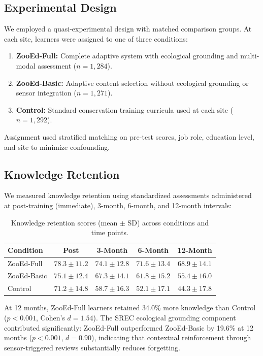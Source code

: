 \documentclass[11pt,a4paper]{article}
\begin{document}
\subsection{Experimental Design}

We employed a quasi-experimental design with matched comparison groups.
At each site, learners were assigned to one of three conditions:

\begin{enumerate}[leftmargin=*]
    \item \textbf{ZooEd-Full:} Complete adaptive system with ecological grounding and multi-modal assessment ($n = 1,284$).
    \item \textbf{ZooEd-Basic:} Adaptive content selection without ecological grounding or sensor integration ($n = 1,271$).
    \item \textbf{Control:} Standard conservation training curricula used at each site ($n = 1,292$).
\end{enumerate}

Assignment used stratified matching on pre-test scores, job role, education level, and site to minimize confounding.

\subsection{Knowledge Retention}

We measured knowledge retention using standardized assessments administered at post-training (immediate), 3-month, 6-month, and 12-month intervals:

\begin{table}[H]
\centering
\caption{Knowledge retention scores (mean $\pm$ SD) across conditions and time points.}
\label{tab:retention}
\begin{tabular}{@{}lcccc@{}}
\toprule
\textbf{Condition} & \textbf{Post} & \textbf{3-Month} & \textbf{6-Month} & \textbf{12-Month} \\
\midrule
ZooEd-Full & $78.3 \pm 11.2$ & $74.1 \pm 12.8$ & $71.6 \pm 13.4$ & $68.9 \pm 14.1$ \\
ZooEd-Basic & $75.1 \pm 12.4$ & $67.3 \pm 14.1$ & $61.8 \pm 15.2$ & $55.4 \pm 16.0$ \\
Control & $71.2 \pm 14.8$ & $58.7 \pm 16.3$ & $52.1 \pm 17.1$ & $44.3 \pm 17.8$ \\
\bottomrule
\end{tabular}
\end{table}

At 12 months, ZooEd-Full learners retained 34.0\% more knowledge than Control ($p < 0.001$, Cohen's $d = 1.54$).
The SREC ecological grounding component contributed significantly: ZooEd-Full outperformed ZooEd-Basic by 19.6\% at 12 months ($p < 0.001$, $d = 0.90$), indicating that contextual reinforcement through sensor-triggered reviews substantially reduces forgetting.
\end{document}
